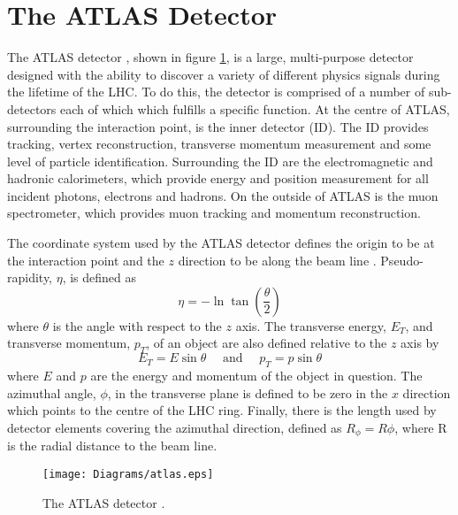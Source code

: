 \section{The ATLAS Detector}

The ATLAS detector \cite{:1999fq}, shown in figure \ref{ATLAS}, is a large, multi-purpose detector designed with the ability to discover a variety of different physics signals during the lifetime of the LHC. To do this, the detector is comprised of a number of sub-detectors each of which which fulfills a specific function. 
At the centre of ATLAS, surrounding the interaction point, is the inner detector (ID).
The ID provides tracking, vertex reconstruction, transverse momentum measurement and some level of particle identification. 
Surrounding the ID are the electromagnetic and hadronic calorimeters, which provide energy and position measurement for all incident photons, electrons and hadrons. On the outside of ATLAS is the muon spectrometer, which provides muon tracking and momentum reconstruction.

The coordinate system used by the ATLAS detector defines the origin to be at the interaction point and the $z$ direction to be along the beam line \cite{:1999fq:Chapter1}. Pseudo-rapidity, $\eta$, is defined as 
\begin{equation}
\eta = -\ln\tan\left(\frac{\theta}{2}\right)
\end{equation}
where $\theta$ is the angle with respect to the $z$ axis. The transverse energy, $E_T$, and transverse momentum, $p_T$, of an object are also defined relative to the $z$ axis by
\begin{equation}
E_T = E\sin\theta \quad \textrm{ and } \quad p_T=p\sin\theta
\end{equation}
where $E$ and $p$ are the energy and momentum of the object in question.
The azimuthal angle, $\phi$, in the transverse plane is defined to be zero in the $x$ direction which points to the centre of the LHC ring. Finally, there is the length used by detector elements covering the azimuthal direction, defined as $R_{\phi} =R\phi$, where R is the radial distance to the beam line.
\begin{figure} [t]
\centering
    	\texttt{[image: Diagrams/atlas.eps]}
\caption[The ATLAS Detector]{The ATLAS detector \cite{:1999fq}.\label{ATLAS}}
\end{figure}

